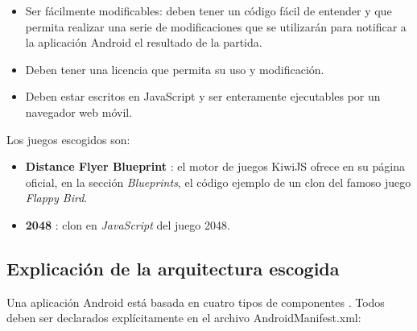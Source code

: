 \documentclass[twoside]{report}
\begin{document}
\begin{itemize}
\item Ser fácilmente modificables: deben tener un código fácil de entender y que permita realizar una serie de modificaciones que se utilizarán para notificar a la aplicación Android el resultado de la partida.

\item Deben tener una licencia que permita su uso y modificación.

\item Deben estar escritos en JavaScript y ser enteramente ejecutables por un navegador web móvil.
\end{itemize}

Los juegos escogidos son:

\begin{itemize}
\item \textbf{Distance Flyer Blueprint} \cite{distancegame}: el motor de juegos KiwiJS ofrece en su página oficial, en la sección \textit{Blueprints}, el código ejemplo de un clon del famoso juego \textit{Flappy Bird}.

\item \textbf{2048} \cite{2048game}: clon en \textit{JavaScript} del juego 2048.
\end{itemize}

\subsection{Explicación de la arquitectura escogida}

Una aplicación Android está basada en cuatro tipos de componentes \cite{androidfund} \cite{androidpacktpub}. Todos deben ser declarados explícitamente en el archivo AndroidManifest.xml:
\end{document}
